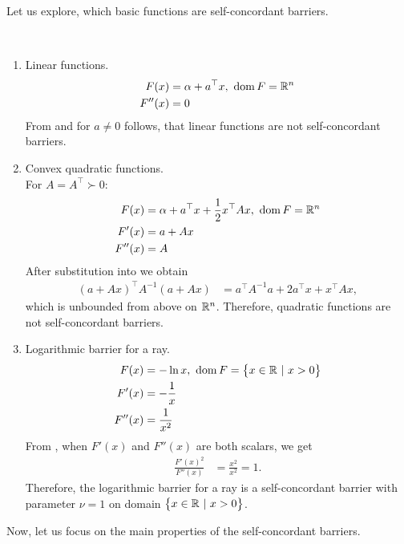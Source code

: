 Let us explore, which basic functions are self-concordant barriers.

\begin{example}~
  \begin{enumerate}
    \item Linear functions.
      \begin{align}
        F(x) &= \alpha + a^\top x,\ \operatorname{dom} F = \mathbb{R}^n\\
        F''(x) &= 0
      \end{align}
      From  and for $a \neq 0$ follows, that linear functions are not self-concordant barriers.

    \item Convex quadratic functions.\\
      For $A = A^\top \succ 0$:
      \begin{align}
        F(x) &= \alpha + a^\top x + \frac{1}{2} x^\top Ax,\ \operatorname{dom} F = \mathbb{R}^n\\
        F'(x) &= a + Ax\\
        F''(x) &= A
      \end{align}
      After substitution into  we obtain
      \begin{align}
        (a + Ax)^\top A^{-1}(a + Ax) &= a^\top A^{-1}a + 2a^\top x + x^\top Ax,
      \end{align}
      which is unbounded from above on $\mathbb{R}^n$. Therefore, quadratic functions are not self-concordant barriers.
      

    \item Logarithmic barrier for a ray.
      \begin{align}
        F(x) &= -\ln x,\ \operatorname{dom} F = \big\{x\in\mathbb{R}\ |\ x > 0\big\}\\
        F'(x) &= -\frac{1}{x}\\
        F''(x) &= \frac{1}{x^2}
      \end{align}
      From , when $F'(x)$ and $F''(x)$ are both scalars, we get
      \begin{align}
        \frac{F'(x)^2}{F''(x)} &= \frac{x^2}{x^2} = 1.
      \end{align}
      Therefore, the logarithmic barrier for a ray is a self-concordant barrier with parameter $\nu = 1$ on domain $\big\{x\in\mathbb{R}\ |\ x > 0\big\}$.
  \end{enumerate}
\end{example}

Now, let us focus on the main properties of the self-concordant barriers.

